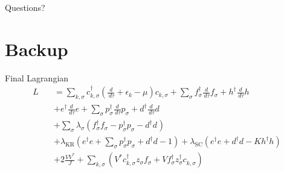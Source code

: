 \documentclass[13pt]{beamer}
\begin{document}
  \begin{frame}[standout]
  Questions?
  \end{frame}

  \appendix

  \section{Backup}

  \begin{frame}{Final Lagrangian}
    \begin{align*}
    L \quad &= \sum_{k,\sigma} c^{\dagger}_{k,\sigma} \left( \frac{d}{\,d\tau} + \epsilon_k - \mu \right) c^{}_{k,\sigma} + \sum_{\sigma} f^{\dagger}_{\sigma} \frac{d}{\,d\tau} f^{}_{\sigma} + h^{\dagger} \frac{d}{\,d\tau}h \\
    &+ e^{\dagger} \frac{d}{\,d\tau} e  + \sum_{\sigma} p^{\dagger}_{\sigma} \frac{d}{\,d\tau} p^{}_{\sigma} + d^{\dagger} \frac{d}{\,d\tau} d \\
    &+ \sum_{\sigma} \lambda^{}_{\sigma} (f^{\dagger}_{\sigma} f^{}_{\sigma} - p^{\dagger}_{\sigma} p^{}_{\sigma} - d^{\dagger} d^{} ) \\
    &+ \lambda_{\text{KR}} ( e^{\dagger} e + \sum_{\sigma} p^{\dagger}_{\sigma} p^{}_{\sigma} + d^{\dagger} d - 1 ) + \lambda_{\text{SC}} ( e^{\dagger} e + d^{\dagger} d - K h^{\dagger} h) \\
    &+ 2 \frac{V V^{\ast}}{J} + \sum_{k,\sigma} \left( V^{\ast} c^{\dagger}_{k,\sigma} z^{}_{\sigma} f^{}_{\sigma} + V f^{\dagger}_{\sigma} z^{\dagger}_{\sigma} c^{}_{k,\sigma} \right)
    \end{align*}
  \end{frame}
\end{document}

